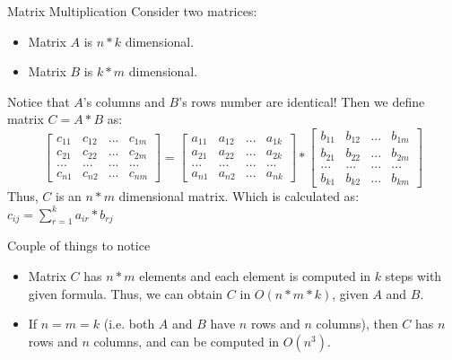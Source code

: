 \documentclass{beamer}
\begin{document}
\begin{frame}{Matrix Multiplication}
	Consider two matrices:
	\pause
	\begin{itemize}
		\item Matrix $A$ is $n * k$ dimensional.
		\pause
		\item Matrix $B$ is $k * m$ dimensional.
	\end{itemize}
	\pause
	Notice that $A$'s columns and $B$'s rows number are identical!
	\pause \newline \newline
	Then we define matrix $C = A * B$ as:
	\newline
	 \[
	 \left[ {\begin{array}{cccc}
       c_{11} & c_{12} & ... & c_{1m} \\
       c_{21} & c_{22} & ... & c_{2m} \\
         ...   &   ...   & ... &   ...   \\
       c_{n1} & c_{n2} & ... & c_{nm}
      \end{array} } \right]
      =
      \left[ {\begin{array}{cccc}
       a_{11} & a_{12} & ... & a_{1k} \\
       a_{21} & a_{22} & ... & a_{2k} \\
         ...   &   ...   & ... &   ...   \\
       a_{n1} & a_{n2} & ... & a_{nk}
      \end{array} } \right]
      *
      \left[ {\begin{array}{cccc}
       b_{11} & b_{12} & ... & b_{1m} \\
       b_{21} & b_{22} & ... & b_{2m} \\
         ...   &   ...   & ... &   ...   \\
       b_{k1} & b_{k2} & ... & b_{km}
      \end{array} } \right]
    \]
    \pause \newline
    Thus, $C$ is an $n * m$ dimensional matrix.
    \newline 
    Which is calculated as: 
    $c_{ij} = \sum\limits_{r=1}^k a_{ir} * b_{rj}$
\end{frame}

\begin{frame}{Couple of things to notice}
	\begin{itemize}
	    \item 
    	    Matrix $C$ has $n * m$ elements and each element is computed in $k$ steps with given formula.
    	    \pause \newline
    	    Thus, we can obtain $C$ in $O(n * m * k)$, given $A$ and $B$.
    	\pause
	    \item
	        If $n = m = k$ (i.e. both $A$ and $B$ have $n$ rows and $n$ columns), 
	        \newline 
	        then $C$ has $n$ rows and $n$ columns, and can be computed in $O(n^3)$.
	\end{itemize}
\end{frame}
\end{document}
